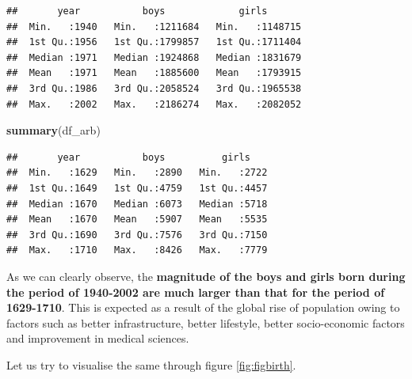 \documentclass[11pt,a4paper,]{article}
\newenvironment{Shaded}{\begin{snugshade}}{\end{snugshade}}
\newcommand{\FunctionTok}[1]{\textcolor[rgb]{0.13,0.29,0.53}{\textbf{#1}}}
\newcommand{\NormalTok}[1]{#1}
\begin{document}
\begin{verbatim}
##       year           boys             girls        
##  Min.   :1940   Min.   :1211684   Min.   :1148715  
##  1st Qu.:1956   1st Qu.:1799857   1st Qu.:1711404  
##  Median :1971   Median :1924868   Median :1831679  
##  Mean   :1971   Mean   :1885600   Mean   :1793915  
##  3rd Qu.:1986   3rd Qu.:2058524   3rd Qu.:1965538  
##  Max.   :2002   Max.   :2186274   Max.   :2082052
\end{verbatim}

\begin{Shaded}
\begin{Highlighting}[]
\FunctionTok{summary}\NormalTok{(df\_arb)}
\end{Highlighting}
\end{Shaded}

\begin{verbatim}
##       year           boys          girls     
##  Min.   :1629   Min.   :2890   Min.   :2722  
##  1st Qu.:1649   1st Qu.:4759   1st Qu.:4457  
##  Median :1670   Median :6073   Median :5718  
##  Mean   :1670   Mean   :5907   Mean   :5535  
##  3rd Qu.:1690   3rd Qu.:7576   3rd Qu.:7150  
##  Max.   :1710   Max.   :8426   Max.   :7779
\end{verbatim}

\normalsize

As we can clearly observe, the \textbf{magnitude of the boys and girls born during the period of 1940-2002 are much larger than that for the period of 1629-1710}. This is expected as a result of the global rise of population owing to factors such as better infrastructure, better lifestyle, better socio-economic factors and improvement in medical sciences.

Let us try to visualise the same through figure \ref{fig:figbirth}.

\scriptsize
\end{document}

